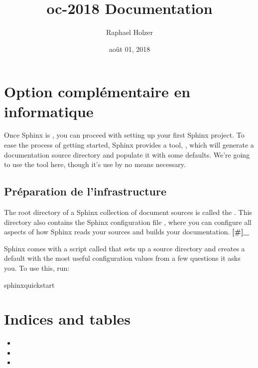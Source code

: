 \documentclass[letterpaper,10pt,french]{sphinxmanual}
\title{oc-2018 Documentation}
\date{août 01, 2018}
\author{Raphael Holzer}
\begin{document}
\maketitle
\sphinxtableofcontents
{}\label{\detokenize{index::doc}}



\chapter{Option complémentaire en informatique}
\label{\detokenize{01-intro:welcome-to-oc-2018-s-documentation}}\label{\detokenize{01-intro:option-complementaire-en-informatique}}\label{\detokenize{01-intro::doc}}
Once Sphinx is , you can proceed with
setting up your first Sphinx project. To ease the process of getting started,
Sphinx provides a tool, , which will generate a
documentation source directory and populate it with some defaults. We’re going
to use the  tool here, though it’s use by no means
necessary.


\section{Préparation de l’infrastructure}
\label{\detokenize{01-intro:preparation-de-l-infrastructure}}
The root directory of a Sphinx collection of  document
sources is called the .  This directory also contains
the Sphinx configuration file , where you can configure all
aspects of how Sphinx reads your sources and builds your documentation.  {\color{red}\bfseries{}{[}\#{]}\_}

Sphinx comes with a script called  that sets up a
source directory and creates a default  with the most useful
configuration values from a few questions it asks you. To use this, run:

%
\begin{sphinxVerbatim}[commandchars=\\\{\}]
\PYGZdl{} sphinx\PYGZhy{}quickstart
\end{sphinxVerbatim}


\chapter{Indices and tables}
\label{\detokenize{index:indices-and-tables}}\begin{itemize}
\item {} 

\item {} 

\item {} 

\end{itemize}



\renewcommand{\indexname}{Index}
\printindex
\end{document}
